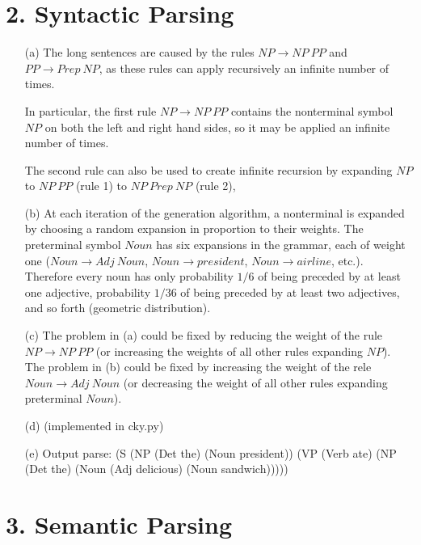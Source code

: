\documentclass{article}
\begin{document}
\section*{2. Syntactic Parsing}

\begin{itemize}
    \item[(a)] The long sentences are caused by the rules $NP \to NP \  PP$ and $PP \to Prep \ NP$, as these rules can apply recursively an infinite number of times. 

    In particular, the first rule $NP \to NP \  PP$  contains the nonterminal symbol $NP$ on both the left and right hand sides, so it may be applied an infinite number of times.

    The second rule can also be used to create infinite recursion by expanding $NP$ to $NP \  PP$ (rule 1) to $NP \ Prep \ NP$ (rule 2),

    \item[(b)] At each iteration of the generation algorithm, a nonterminal is expanded by choosing a random expansion in proportion to their weights. The preterminal symbol $Noun$ has six expansions in the grammar, each of weight one ($Noun \to Adj \ Noun$, $Noun \to president$, $Noun \to airline$, etc.). Therefore every noun has only probability $1/6$ of being preceded by at least one adjective, probability $1/36$ of being preceded by at least two adjectives, and so forth (geometric distribution).

    \item[(c)] The problem in (a) could be fixed by reducing the weight of the rule $NP \to NP \  PP$ (or increasing the weights of all other rules expanding $NP$). The problem in (b) could be fixed by increasing the weight of the rele $Noun \to Adj \ Noun$ (or decreasing the weight of all other rules expanding preterminal $Noun$).

    \item[(d)] (implemented in cky.py)

    \item[(e)] Output parse: (S (NP (Det the) (Noun president)) (VP (Verb ate) (NP (Det the) (Noun (Adj delicious) (Noun sandwich)))))

\end{itemize}

\section*{3. Semantic Parsing}
\end{document}
